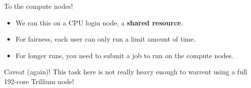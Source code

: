 \documentclass[
  10pt,
  ignorenonframetext,
  aspectratio=169]{beamer}
\newenvironment{Shaded}{\begin{snugshade}}{\end{snugshade}}
\newcommand{\ExtensionTok}[1]{\textcolor[rgb]{0.80,0.80,0.80}{#1}}
\newcommand{\KeywordTok}[1]{\textcolor[rgb]{0.94,0.87,0.69}{#1}}
\newcommand{\NormalTok}[1]{\textcolor[rgb]{0.80,0.80,0.80}{#1}}
\begin{document}
\begin{frame}[fragile]{To the compute nodes!}
\label{to-the-compute-nodes}
\begin{Shaded}
\end{Shaded}

\begin{itemize}
\item
  We ran this on a CPU login node, a \textbf{shared resource}.
\item
  For fairness, each user can only run a limit amount of time.

  \pause
\item
  For longer runs, you need to submit a job to run on the compute nodes.

  \pause
\end{itemize}

\alert{Caveat (again)! This task here is not really heavy enough to warrent using a full 192-core Trillium node!}
\end{frame}
\end{document}
